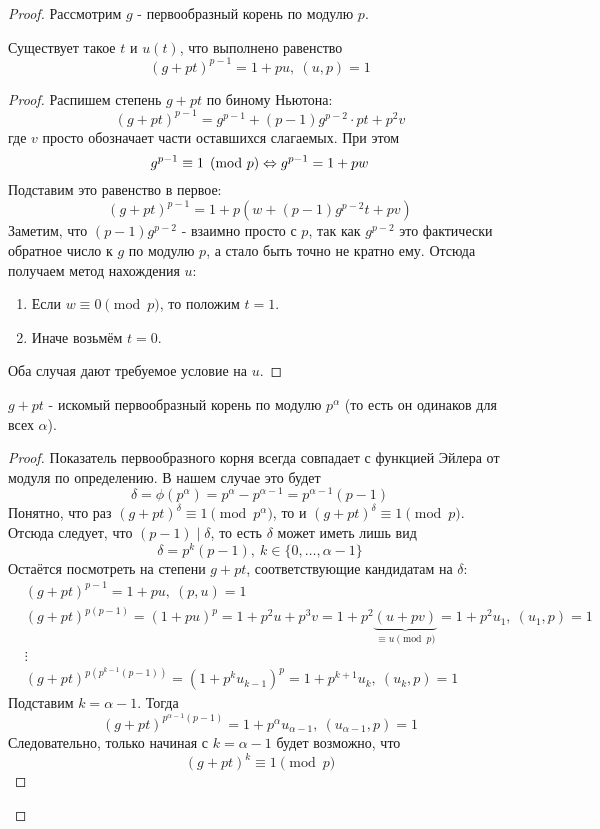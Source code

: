 \begin{proof}
	Рассмотрим $g$ - первообразный корень по модулю $p$.
	
	\begin{lemma}
		Существует такое $t$ и $u(t)$, что выполнено равенство
		\[
			(g + pt)^{p - 1} = 1 + pu,\ (u, p) = 1
		\]
	\end{lemma}

	\begin{proof}
		Распишем степень $g + pt$ по биному Ньютона:
		\[
			(g + pt)^{p - 1} = g^{p - 1} + (p - 1)g^{p - 2} \cdot pt + p^2 v
		\]
		где $v$ просто обозначает части оставшихся слагаемых. При этом
		\[
			g^{p - 1} \equiv 1 \pmod p \Leftrightarrow g^{p - 1} = 1 + pw
		\]
		Подставим это равенство в первое:
		\[
			(g + pt)^{p - 1} = 1 + p(w + (p - 1)g^{p - 2}t + pv)
		\]
		Заметим, что $(p - 1)g^{p - 2}$ - взаимно просто с $p$, так как $g^{p - 2}$ это фактически обратное число к $g$ по модулю $p$, а стало быть точно не кратно ему. Отсюда получаем метод нахождения $u$:
		\begin{enumerate}
			\item Если $w \equiv 0 \pmod p$, то положим $t = 1$.
			\item Иначе возьмём $t = 0$.
		\end{enumerate}
		Оба случая дают требуемое условие на $u$.
	\end{proof}

	\begin{proposition}
		$g + pt$ - искомый первообразный корень по модулю $p^\alpha$ (то есть он одинаков для всех $\alpha$).
	\end{proposition}

	\begin{proof}
		Показатель первообразного корня всегда совпадает с функцией Эйлера от модуля по определению. В нашем случае это будет
		\[
			\delta = \phi(p^\alpha) = p^\alpha - p^{\alpha - 1} = p^{\alpha - 1}(p - 1)
		\]
		Понятно, что раз $(g + pt)^\delta \equiv 1 \pmod {p^\alpha}$, то и $(g + pt)^\delta \equiv 1 \pmod p$. Отсюда следует, что $(p - 1) \mid \delta$, то есть $\delta$ может иметь лишь вид
		\[
			\delta = p^k (p - 1),\ k \in \{0, \ldots, \alpha - 1\}
		\]
		Остаётся посмотреть на степени $g + pt$, соответствующие кандидатам на $\delta$:
		\begin{align*}
			&{(g + pt)^{p - 1} = 1 + pu,\ (p, u) = 1}
			\\
			&{(g + pt)^{p(p - 1)} = (1 + pu)^p = 1 + p^2u + p^3v = 1 + p^2\underbrace{(u + pv)}_{\equiv u \pmod p} = 1 + p^2u_1,\ (u_1, p) = 1}
			\\
			&{\vdots}
			\\
			&{(g + pt)^{p(p^{k - 1}(p - 1))} = (1 + p^k u_{k - 1})^p = 1 + p^{k + 1}u_k,\ (u_k, p) = 1}
		\end{align*}
		Подставим $k = \alpha - 1$. Тогда
		\[
			(g + pt)^{p^{\alpha - 1}(p - 1)} = 1 + p^\alpha u_{\alpha - 1},\ (u_{\alpha - 1}, p) = 1
		\]
		Следовательно, только начиная с $k = \alpha - 1$ будет возможно, что
		\[
			(g + pt)^k \equiv 1 \pmod p
		\]
	\end{proof}
\end{proof}

